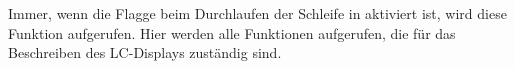 \subsubsection{} %
\label{ssub:void_update_display}
Immer, wenn die Flagge  beim Durchlaufen der Schleife in  aktiviert ist, wird diese Funktion aufgerufen. Hier werden alle Funktionen aufgerufen, die für das Beschreiben des LC-Displays zuständig sind.
